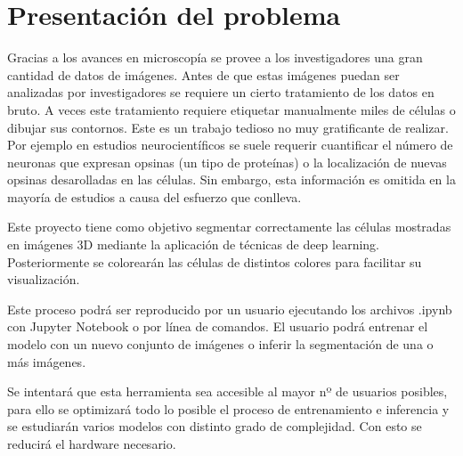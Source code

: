 \chapter{Presentaci\'on del problema}\label{defobjetivos}

Gracias a los avances en microscopía se provee a los investigadores una gran cantidad de datos de imágenes. Antes de que estas imágenes puedan ser analizadas por investigadores se requiere un cierto tratamiento de los datos en bruto. A veces este tratamiento requiere etiquetar manualmente miles de células o dibujar sus contornos. Este es un trabajo tedioso no muy gratificante de realizar. Por ejemplo en estudios neurocientíficos se suele requerir cuantificar el número de neuronas que expresan opsinas (un tipo de proteínas) o la localización de nuevas opsinas desarolladas en las células. Sin embargo, esta información es omitida en la mayoría de estudios a causa del esfuerzo que conlleva.

Este proyecto tiene como objetivo segmentar correctamente las células mostradas en imágenes 3D mediante la aplicación de técnicas de deep learning. Posteriormente se colorearán las células de distintos colores para facilitar su visualización. 

Este proceso podrá ser reproducido por un usuario ejecutando los archivos .ipynb con Jupyter Notebook o por línea de comandos. El usuario podrá entrenar el modelo con un nuevo conjunto de imágenes o inferir la segmentación de una o más imágenes.

Se intentará que esta herramienta sea accesible al mayor nº de usuarios posibles, para ello se optimizará todo lo posible el proceso de entrenamiento e inferencia y se estudiarán varios modelos con distinto grado de complejidad. Con esto se reducirá el hardware necesario.